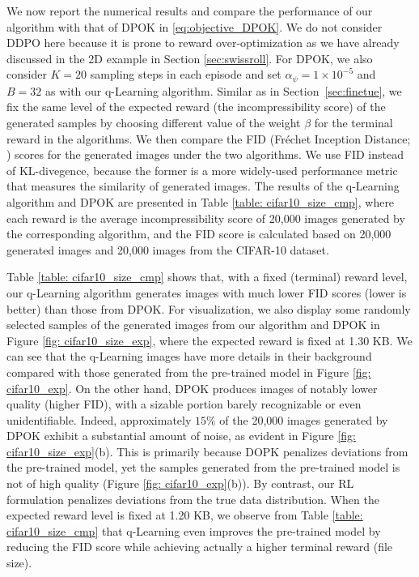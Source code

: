 \documentclass[11pt]{article}
\begin{document}
We now report the numerical results and compare the performance of our algorithm with that of DPOK in \eqref{eq:objective_DPOK}. We do not consider DDPO here because it is prone to reward over-optimization as we have already discussed in the 2D example in Section \ref{sec:swissroll}. For DPOK, we also consider $K=20$ sampling steps in each episode and set $\alpha_\psi=1\times 10^{-5}$ and $B=32$ as with our q-Learning algorithm.
Similar as in Section~\ref{sec:finetue}, we fix the same
level of the expected reward (the incompressibility score) of the generated samples by choosing different value of the weight $\beta$ for the terminal reward in the algorithms. We then compare the FID (Fr\'{e}chet Inception Distance; \citealp{heusel2017gans}) scores for the generated images under the two algorithms. We use FID instead of KL-divegence, because the former  is a more widely-used performance metric that measures the similarity of generated images.
The results of the q-Learning algorithm and DPOK are presented in Table \ref{table: cifar10_size_cmp}, where each reward is the average incompressibility score of 20,000 images generated by the corresponding algorithm, and the FID score is calculated based on 20,000 generated images and 20,000 images from the CIFAR-10 dataset.



Table \ref{table: cifar10_size_cmp} shows that, with a fixed (terminal) reward level, our q-Learning algorithm generates images with much lower FID scores (lower is better) than those from DPOK. For visualization, we also
display some randomly selected samples of the generated images from our algorithm and DPOK  in Figure \ref{fig: cifar10_size_exp}, where the expected reward is fixed at 1.30 KB. We can see that the q-Learning images have more details in their background compared with those generated from the pre-trained model in Figure \ref{fig: cifar10_exp}. On the other hand, DPOK produces images of notably lower quality (higher FID), with a sizable portion barely recognizable or even unidentifiable. Indeed, approximately $15\%$ of the 20,000 images generated by DPOK exhibit a substantial amount of noise, as evident in Figure \ref{fig: cifar10_size_exp}(b).
This is primarily because DOPK penalizes deviations from the pre-trained model, yet the samples generated from the pre-trained model is not of high quality (Figure \ref{fig: cifar10_exp}(b)). By contrast, our RL formulation penalizes deviations from the true data distribution.
When the expected reward level is fixed at 1.20 KB, we observe from Table \ref{table: cifar10_size_cmp} that q-Learning even improves the pre-trained model by reducing the FID score while achieving actually a higher terminal reward (file size).
\end{document}
